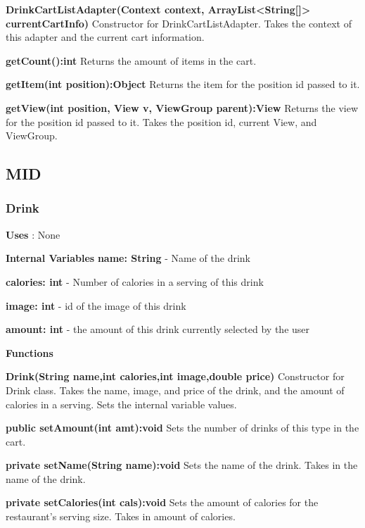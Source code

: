 \documentclass [10pt]{article}
\begin{document}
\textbf{DrinkCartListAdapter(Context context, ArrayList<String[]> currentCartInfo)}
Constructor for DrinkCartListAdapter. Takes the context of this adapter and the current cart information.

\textbf{getCount():int}
Returns the amount of items in the cart.

\textbf{getItem(int position):Object}
Returns the item for the position id passed to it.

\textbf{getView(int position, View v, ViewGroup parent):View}
Returns the view for the position id passed to it. Takes the position id, current View, and ViewGroup.


\subsection{MID}


\subsubsection{Drink}

\textbf{Uses} : None

\textbf{Internal Variables}
\textbf{name: String} - Name of the drink

\textbf{calories: int} - Number of calories in a serving of this drink

\textbf{image: int} - id of the image of this drink

\textbf{amount: int} - the amount of this drink currently selected by the user

\textbf{Functions}

\textbf{Drink(String name,int calories,int image,double price)}
Constructor for Drink class. Takes the name, image, and price of the drink, and the amount of calories in a serving. Sets the internal variable values.

\textbf{public setAmount(int amt):void}
Sets the number of drinks of this type in the cart.

\textbf{private setName(String name):void}
Sets the name of the drink. Takes in the name of the drink.

\textbf{private setCalories(int cals):void}
Sets the amount of calories for the restaurant's serving size. Takes in amount of calories.
\end{document}
